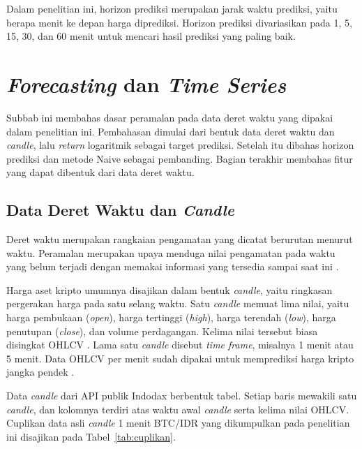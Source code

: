 Dalam penelitian ini, horizon prediksi merupakan jarak waktu prediksi,
yaitu berapa menit ke depan harga diprediksi. Horizon prediksi divariasikan
pada 1, 5, 15, 30, dan 60 menit untuk mencari hasil prediksi yang paling
baik.


\section{\textit{Forecasting} dan \textit{Time Series}}
Subbab ini membahas dasar peramalan pada data deret waktu yang dipakai dalam
penelitian ini. Pembahasan dimulai dari bentuk data deret waktu dan
\textit{candle}, lalu \textit{return} logaritmik sebagai target prediksi.
Setelah itu dibahas horizon prediksi dan metode Naive sebagai pembanding.
Bagian terakhir membahas fitur yang dapat dibentuk dari data deret waktu.

\subsection{Data Deret Waktu dan \textit{Candle}}
Deret waktu merupakan rangkaian pengamatan yang dicatat berurutan menurut
waktu. Peramalan merupakan upaya menduga nilai pengamatan pada waktu yang belum
terjadi dengan memakai informasi yang tersedia sampai saat ini
\cite{hyndman2014fpp}.

Harga aset kripto umumnya disajikan dalam bentuk \textit{candle}, yaitu
ringkasan pergerakan harga pada satu selang waktu. Satu \textit{candle}
memuat lima nilai, yaitu harga pembukaan (\textit{open}), harga tertinggi
(\textit{high}), harga terendah (\textit{low}), harga penutupan
(\textit{close}), dan volume perdagangan. Kelima nilai tersebut biasa disingkat
OHLCV \cite{indodaxapi}. Lama satu \textit{candle} disebut \textit{time frame},
misalnya 1 menit atau 5 menit.
Data OHLCV per menit sudah dipakai untuk memprediksi harga kripto jangka pendek
\cite{rodrigues2025}.

Data \textit{candle} dari API publik Indodax berbentuk tabel. Setiap baris
mewakili satu \textit{candle}, dan kolomnya terdiri atas waktu awal
\textit{candle} serta kelima nilai OHLCV. Cuplikan data asli \textit{candle}
1 menit BTC/IDR yang dikumpulkan pada penelitian ini disajikan pada Tabel~\ref{tab:cuplikan}.

